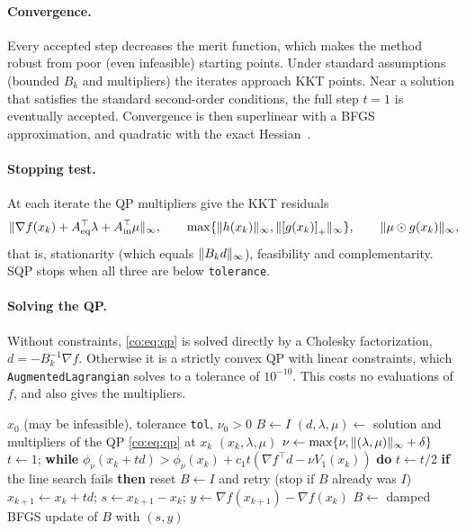 \paragraph{Convergence.}
Every accepted step decreases the merit function, which makes the method robust
from poor (even infeasible) starting points. Under standard assumptions (bounded
$B_k$ and multipliers) the iterates approach KKT points.
Near a solution that satisfies the standard second-order conditions, the full step $t=1$
is eventually accepted. Convergence is then superlinear with a BFGS
approximation, and quadratic with the exact Hessian~\cite{nocedal2006}.

\paragraph{Stopping test.}
At each iterate the QP multipliers give the KKT residuals
\[
  \lVert \nabla f(x_k)+A_{\mathrm{eq}}^\top\lambda+A_{\mathrm{in}}^\top\mu\rVert_\infty,\qquad
  \max\{\lVert h(x_k)\rVert_\infty,\lVert \left[g(x_k)\right]_+\rVert_\infty\},\qquad
  \lVert \mu\odot g(x_k)\rVert_\infty ,
\]
that is, stationarity (which equals $\lVert B_k d\rVert_\infty$), feasibility and complementarity.
SQP stops when all three are below \texttt{tolerance}.

\paragraph{Solving the QP.}
Without constraints, \eqref{co:eq:qp} is solved directly by a Cholesky factorization, $d=-B_k^{-1}\nabla f$.
Otherwise it is a strictly convex QP with linear constraints, which
\texttt{AugmentedLagrangian} solves to a tolerance of $10^{-10}$.
This costs no evaluations of $f$, and also gives the multipliers.

\begin{algorithm}[ht]
\caption{SQP with damped BFGS and $\ell_1$ merit line search}\label{co:alg:sqp}
\begin{algorithmic}[1]
\Require $x_0$ (may be infeasible), tolerance \texttt{tol}, $\nu_0>0$
\State $B\gets I$
  \State $(d,\lambda,\mu)\gets$ solution and multipliers of the QP \eqref{co:eq:qp} at $x_k$
   \Return $(x_k,\lambda,\mu)$ \EndIf
  \State $\nu\gets\max\{\nu,\lVert (\lambda,\mu)\rVert_\infty+\delta\}$
  \State $t\gets 1$; \textbf{while} $\phi_\nu(x_k+td)>\phi_\nu(x_k)+c_1t(\nabla f^\top d-\nu V_1(x_k))$ \textbf{do} $t\gets t/2$
  \State \textbf{if} the line search fails \textbf{then} reset $B\gets I$ and retry (stop if $B$ already was $I$)
  \State $x_{k+1}\gets x_k+td$;\; $s\gets x_{k+1}-x_k$;\; $y\gets\nabla f(x_{k+1})-\nabla f(x_k)$
  \State $B\gets$ damped BFGS update of $B$ with $(s,y)$ 
\EndFor
\end{algorithmic}
\end{algorithm}

